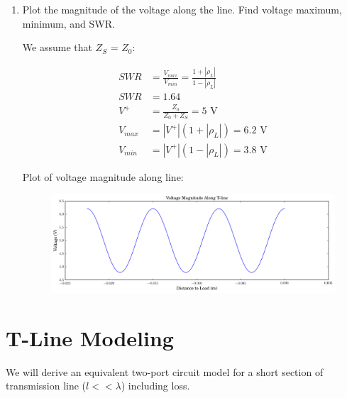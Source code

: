 \documentclass[11pt]{article}
\begin{document}
\begin{enumerate}
	\item Plot the magnitude of the voltage along the line. Find voltage maximum, minimum, and SWR.
	
	We assume that $Z_S$ = $Z_0$:
	
	\begin{align*}
		SWR &= \frac{V_{max}}{V_{min}} = \frac{1 + |\rho_L|}{1 - |\rho_L|} \\
		SWR &= 1.64 \\
		V^+ &= \frac{Z_0}{Z_0 + Z_S} = 5 \text{ V} \\
		V_{max} &= |V^+| (1 + |\rho_L|) = 6.2 \text{ V} \\
		V_{min} &= |V^+| (1 - |\rho_L|) = 3.8 \text{ V} 
	\end{align*}
	
	Plot of voltage magnitude along line:
	\begin{figure}[H]
		\centering \includegraphics[width=\textwidth]{images/problem1.png}
	\end{figure}
\end{enumerate}

\section{T-Line Modeling}
We will derive an equivalent two-port circuit model for a short section of transmission line ($l << \lambda$) including loss.
\end{document}
